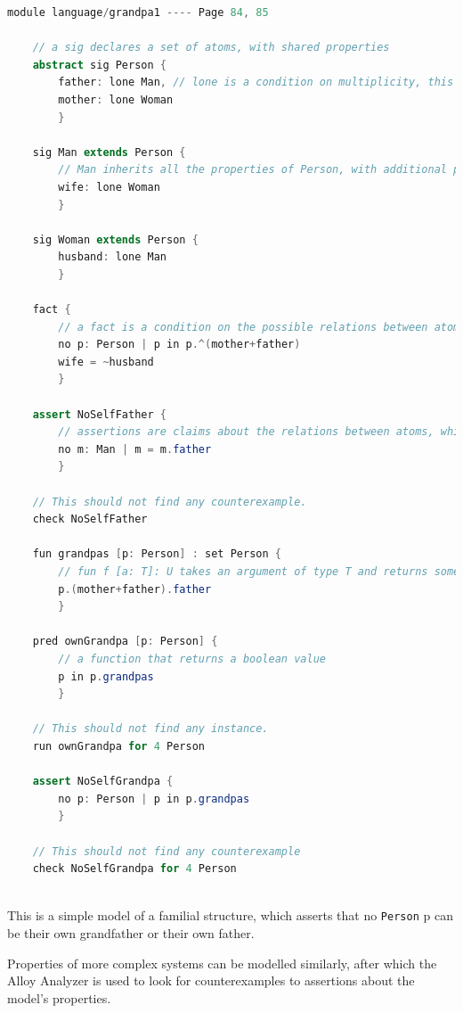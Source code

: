 \documentclass[conference]{IEEEtran}
\begin{document}
\begin{lstlisting}[language=Java]
    module language/grandpa1 ---- Page 84, 85

    // a sig declares a set of atoms, with shared properties
    abstract sig Person {
        father: lone Man, // lone is a condition on multiplicity, this means that every Person p has exactly one Man m as p.father
        mother: lone Woman
        }
    
    sig Man extends Person {
        // Man inherits all the properties of Person, with additional properties
        wife: lone Woman
        }
    
    sig Woman extends Person {
        husband: lone Man
        }
    
    fact {
        // a fact is a condition on the possible relations between atoms
        no p: Person | p in p.^(mother+father)
        wife = ~husband
        }
    
    assert NoSelfFather {
        // assertions are claims about the relations between atoms, which are not necessarily true. They may be true as a consequence of the definitions of the sigs and facts, which is determined by the Analyzer
        no m: Man | m = m.father
        }
    
    // This should not find any counterexample.
    check NoSelfFather
    
    fun grandpas [p: Person] : set Person {
        // fun f [a: T]: U takes an argument of type T and returns something of type U
        p.(mother+father).father
        }
    
    pred ownGrandpa [p: Person] {
        // a function that returns a boolean value
        p in p.grandpas
        }
    
    // This should not find any instance.
    run ownGrandpa for 4 Person
    
    assert NoSelfGrandpa {
        no p: Person | p in p.grandpas
        }
    
    // This should not find any counterexample
    check NoSelfGrandpa for 4 Person
    
\end{lstlisting}

This is a simple model of a familial structure, which asserts that no \verb|Person| p can be their own grandfather or their own father. 

Properties of more complex systems can be modelled similarly, after which the Alloy Analyzer is used to look for counterexamples to assertions about the model's properties.
\end{document}
